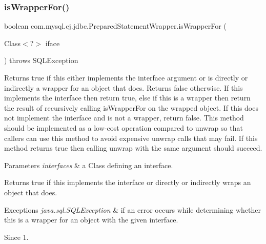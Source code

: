 \subsubsection{\texorpdfstring{is\+Wrapper\+For()}{isWrapperFor()}}
{\footnotesize\ttfamily boolean com.\+mysql.\+cj.\+jdbc.\+Prepared\+Statement\+Wrapper.\+is\+Wrapper\+For (\begin{DoxyParamCaption}\item[{Class$<$?$>$}]{iface }\end{DoxyParamCaption}) throws S\+Q\+L\+Exception}

Returns true if this either implements the interface argument or is directly or indirectly a wrapper for an object that does. Returns false otherwise. If this implements the interface then return true, else if this is a wrapper then return the result of recursively calling {\ttfamily is\+Wrapper\+For} on the wrapped object. If this does not implement the interface and is not a wrapper, return false. This method should be implemented as a low-\/cost operation compared to {\ttfamily unwrap} so that callers can use this method to avoid expensive {\ttfamily unwrap} calls that may fail. If this method returns true then calling {\ttfamily unwrap} with the same argument should succeed.


\begin{DoxyParams}{Parameters}
{\em interfaces} & a Class defining an interface. \\
\hline
\end{DoxyParams}
\begin{DoxyReturn}{Returns}
true if this implements the interface or directly or indirectly wraps an object that does. 
\end{DoxyReturn}

\begin{DoxyExceptions}{Exceptions}
{\em java.\+sql.\+S\+Q\+L\+Exception} & if an error occurs while determining whether this is a wrapper for an object with the given interface. \\
\hline
\end{DoxyExceptions}
\begin{DoxySince}{Since}
1. 
\end{DoxySince}
\mbox{\label{classcom_1_1mysql_1_1cj_1_1jdbc_1_1_prepared_statement_wrapper_a8cc6318267fc3fe6820a11923c04538c}} 
